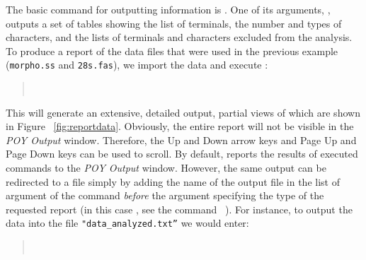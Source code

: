 {The basic command for outputting information is . One of its arguments, , 
outputs a set of tables showing the list of terminals, the number and types of characters, and the lists of terminals and 
characters excluded from the analysis. To produce a report of the data files that were used in the previous example 
(\texttt{morpho.ss} and \texttt{28s.fas}), we import the data and execute :
\begin{quote}
\\
\end{quote}
This will generate an extensive, detailed output, partial views of which are shown in Figure ~\ref{fig:reportdata}. 
Obviously, the entire report will not be visible in the \emph{POY Output} window. Therefore, the Up and Down 
arrow keys and Page Up and Page Down keys can be used to scroll.  By default, \poy reports the results of executed 
commands to the \emph{POY Output} window. However, the same output can be redirected to a file simply by adding 
the name of the output file in the list of argument of the command  \emph{before} the argument 
specifying the type of the requested report (in this case , see the command~ ). For 
instance, to output the data into the file \texttt{"data\_analyzed.txt''} we would enter:
\begin{quote}
\\
\end{quote}

}

